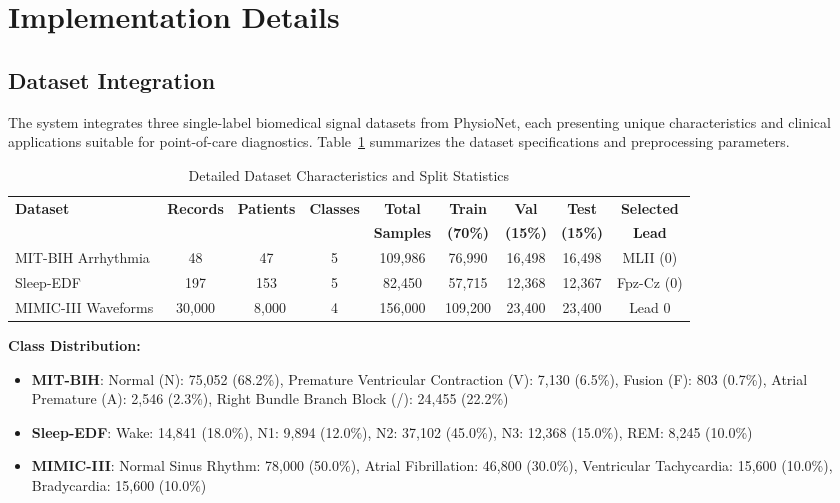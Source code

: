 \documentclass[conference]{IEEEtran}
\begin{document}
\section{Implementation Details}

\subsection{Dataset Integration}

The system integrates three single-label biomedical signal datasets from PhysioNet, each presenting unique characteristics and clinical applications suitable for point-of-care diagnostics. Table~\ref{tab:datasets} summarizes the dataset specifications and preprocessing parameters.

\begin{table}[htbp]
\caption{Detailed Dataset Characteristics and Split Statistics}
\label{tab:datasets}
\centering
\begin{tabular}{lcccccccc}
\toprule
\textbf{Dataset} & \textbf{Records} & \textbf{Patients} & \textbf{Classes} & \textbf{Total} & \textbf{Train} & \textbf{Val} & \textbf{Test} & \textbf{Selected} \\
 & & & & \textbf{Samples} & \textbf{(70\%)} & \textbf{(15\%)} & \textbf{(15\%)} & \textbf{Lead} \\
\midrule
MIT-BIH Arrhythmia & 48 & 47 & 5 & 109,986 & 76,990 & 16,498 & 16,498 & MLII (0) \\
Sleep-EDF & 197 & 153 & 5 & 82,450 & 57,715 & 12,368 & 12,367 & Fpz-Cz (0) \\
MIMIC-III Waveforms & 30,000 & ~8,000 & 4 & 156,000 & 109,200 & 23,400 & 23,400 & Lead 0 \\
\bottomrule
\end{tabular}
\end{table}

\textbf{Class Distribution:}
\begin{itemize}
\item \textbf{MIT-BIH}: Normal (N): 75,052 (68.2\%), Premature Ventricular Contraction (V): 7,130 (6.5\%), Fusion (F): 803 (0.7\%), Atrial Premature (A): 2,546 (2.3\%), Right Bundle Branch Block (/): 24,455 (22.2\%)
\item \textbf{Sleep-EDF}: Wake: 14,841 (18.0\%), N1: 9,894 (12.0\%), N2: 37,102 (45.0\%), N3: 12,368 (15.0\%), REM: 8,245 (10.0\%)
\item \textbf{MIMIC-III}: Normal Sinus Rhythm: 78,000 (50.0\%), Atrial Fibrillation: 46,800 (30.0\%), Ventricular Tachycardia: 15,600 (10.0\%), Bradycardia: 15,600 (10.0\%)
\end{itemize}
\end{document}
